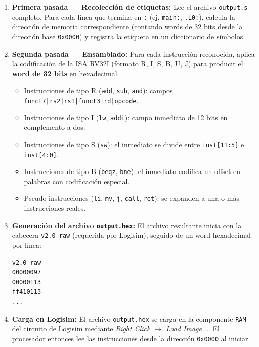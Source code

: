 \begin{enumerate}
    \item \textbf{Primera pasada — Recolección de etiquetas:}
    Lee el archivo \texttt{output.s} completo. Para cada línea que termina en \texttt{:} (ej. \texttt{main:}, \texttt{.L0:}), calcula la dirección de memoria correspondiente (contando words de 32 bits desde la dirección base \texttt{0x0000}) y registra la etiqueta en un diccionario de símbolos.

    \item \textbf{Segunda pasada — Ensamblado:}
    Para cada instrucción reconocida, aplica la codificación de la ISA RV32I (formato R, I, S, B, U, J) para producir el \textbf{word de 32 bits} en hexadecimal.
    \begin{itemize}
        \item Instrucciones de tipo R (\texttt{add}, \texttt{sub}, \texttt{and}): campos \texttt{funct7|rs2|rs1|funct3|rd|opcode}.
        \item Instrucciones de tipo I (\texttt{lw}, \texttt{addi}): campo inmediato de 12 bits en complemento a dos.
        \item Instrucciones de tipo S (\texttt{sw}): el inmediato se divide entre \texttt{inst[11:5]} e \texttt{inst[4:0]}.
        \item Instrucciones de tipo B (\texttt{beqz}, \texttt{bne}): el inmediato codifica un offset en palabras con codificación especial.
        \item Pseudo-instrucciones (\texttt{li}, \texttt{mv}, \texttt{j}, \texttt{call}, \texttt{ret}): se expanden a una o más instrucciones reales.
    \end{itemize}

    \item \textbf{Generación del archivo \texttt{output.hex}:}
    El archivo resultante inicia con la cabecera \texttt{v2.0 raw} (requerida por Logisim), seguido de un word hexadecimal por línea:

\begin{verbatim}
v2.0 raw
00000097
00000113
ff410113
...
\end{verbatim}

    \item \textbf{Carga en Logisim:}
    El archivo \texttt{output.hex} se carga en la componente \texttt{RAM} del circuito de Logisim mediante \textit{Right Click $\rightarrow$ Load Image...}. El procesador entonces lee las instrucciones desde la dirección \texttt{0x0000} al iniciar.
\end{enumerate}

